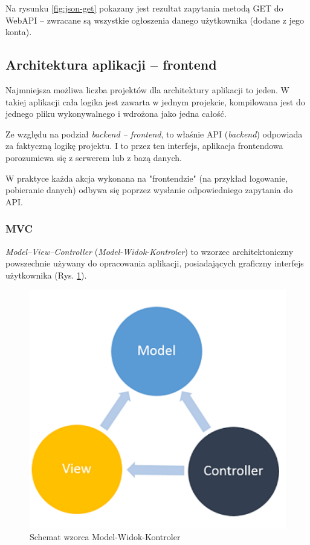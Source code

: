 \documentclass[12pt]{article}
\numberwithin{figure}{section}
\begin{document}
\begin{sloppypar}
        Na rysunku \ref{fig:json-get} pokazany jest rezultat zapytania metodą GET do WebAPI -- zwracane są wszystkie ogłoszenia danego użytkownika (dodane z jego konta).
        
\clearpage
\subsection{Architektura aplikacji -- frontend}
Najmniejsza możliwa liczba projektów dla architektury aplikacji to jeden. W takiej aplikacji cała logika jest zawarta w jednym projekcie, kompilowana jest do jednego pliku wykonywalnego i wdrożona jako jedna całość. 
    
Ze względu na podział \textit{backend -- frontend}, to właśnie API (\textit{backend}) odpowiada za faktyczną logikę projektu. I to przez ten interfejs, aplikacja frontendowa porozumiewa się z serwerem lub z bazą danych. 
    
W praktyce każda akcja wykonana na "frontendzie" (na przykład logowanie, pobieranie danych) odbywa się poprzez wysłanie odpowiedniego zapytania do API. 
    
\subsubsection{MVC}
\textit{Model–View–Controller} (\textit{Model-Widok-Kontroler}) to wzorzec architektoniczny powszechnie używany do opracowania aplikacji, posiadających graficzny interfejs użytkownika (Rys. \ref{fig:mvc}). 

\begin{figure}[H] 
    \centering
    \includegraphics[width=.48\textwidth]{images/chapter_3/mvc.png}
    \caption{Schemat wzorca Model-Widok-Kontroler \cite{mvc}}
    \label{fig:mvc}
\end{figure}
    

\end{sloppypar}
\end{document}
